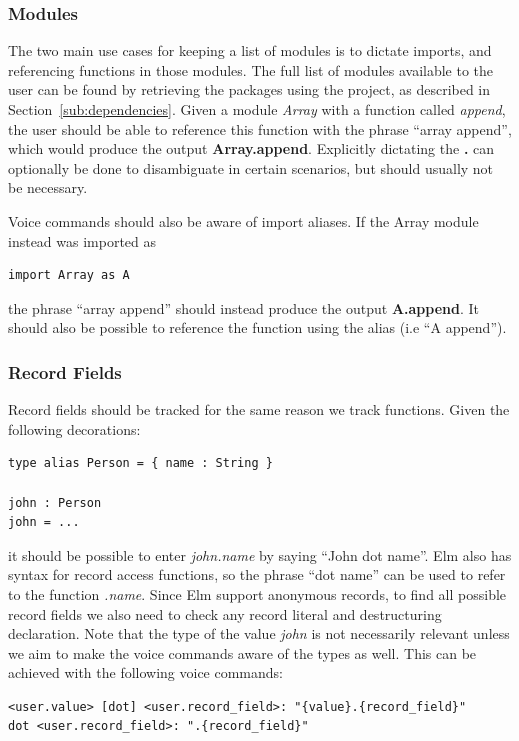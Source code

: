 \documentclass[../thesis.tex]{subfiles}
\begin{document}
\subsubsection{Modules}%
\label{par:modules}
The two main use cases for keeping a list of modules is to dictate imports, and referencing functions in those modules.
The full list of modules available to the user can be found by retrieving the packages using the project, as described in Section~\ref{sub:dependencies}.
Given a module \textit{Array} with a function called \textit{append}, the user should be able to
reference this function with the phrase ``array append'', which would produce the output \textbf{Array.append}.
Explicitly dictating the \textbf{.} can optionally be done to disambiguate in certain scenarios, but should usually not be necessary.

Voice commands should also be aware of import aliases.
If the Array module instead was imported as
\begin{verbatim}
import Array as A
\end{verbatim}
the phrase ``array append'' should instead produce the output \textbf{A.append}.
It should also be possible to reference the function using the alias (i.e ``A append'').

\subsubsection{Record Fields}
Record fields should be tracked for the same reason we track functions.
Given the following decorations:
\begin{verbatim}
type alias Person = { name : String }

john : Person
john = ...
\end{verbatim}
it should be possible to enter \textit{john.name} by saying ``John dot name''.
Elm also has syntax for record access functions, so the phrase ``dot name'' can be used to
refer to the function \textit{.name}.
Since Elm support anonymous records, to find all possible record fields we also need to check
any record literal and destructuring declaration.
Note that the type of the value \textit{john} is not necessarily relevant unless we
aim to make the voice commands aware of the types as well.%
This can be achieved with the following voice commands:
\begin{verbatim}
<user.value> [dot] <user.record_field>: "{value}.{record_field}"
dot <user.record_field>: ".{record_field}"
\end{verbatim}
\end{document}
